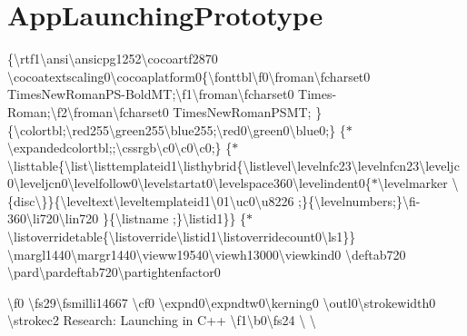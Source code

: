 \chapter{App\+Launching\+Prototype }
\hypertarget{md__e_1_2_github_2_wheel_time_2notes_2_app_launching_prototype}{}\label{md__e_1_2_github_2_wheel_time_2notes_2_app_launching_prototype}
\{\textbackslash{}rtf1\textbackslash{}ansi\textbackslash{}ansicpg1252\textbackslash{}cocoartf2870 \textbackslash{}cocoatextscaling0\textbackslash{}cocoaplatform0\{\textbackslash{}fonttbl\textbackslash{}f0\textbackslash{}froman\textbackslash{}fcharset0 Times\+New\+Roman\+PS-\/\+Bold\+MT;\textbackslash{}f1\textbackslash{}froman\textbackslash{}fcharset0 Times-\/\+Roman;\textbackslash{}f2\textbackslash{}froman\textbackslash{}fcharset0 Times\+New\+Roman\+PSMT; \} \{\textbackslash{}colortbl;\textbackslash{}red255\textbackslash{}green255\textbackslash{}blue255;\textbackslash{}red0\textbackslash{}green0\textbackslash{}blue0;\} \{\texorpdfstring{$\ast$}{*}\textbackslash{}expandedcolortbl;;\textbackslash{}cssrgb\textbackslash{}c0\textbackslash{}c0\textbackslash{}c0;\} \{\texorpdfstring{$\ast$}{*}\textbackslash{}listtable\{\textbackslash{}list\textbackslash{}listtemplateid1\textbackslash{}listhybrid\{\textbackslash{}listlevel\textbackslash{}levelnfc23\textbackslash{}levelnfcn23\textbackslash{}leveljc0\textbackslash{}leveljcn0\textbackslash{}levelfollow0\textbackslash{}levelstartat0\textbackslash{}levelspace360\textbackslash{}levelindent0\{\texorpdfstring{$\ast$}{*}\textbackslash{}levelmarker \textbackslash{}\{disc\textbackslash{}\}\}\{\textbackslash{}leveltext\textbackslash{}leveltemplateid1\textbackslash{}\textquotesingle{}01\textbackslash{}uc0\textbackslash{}u8226 ;\}\{\textbackslash{}levelnumbers;\}\textbackslash{}fi-\/360\textbackslash{}li720\textbackslash{}lin720 \}\{\textbackslash{}listname ;\}\textbackslash{}listid1\}\} \{\texorpdfstring{$\ast$}{*}\textbackslash{}listoverridetable\{\textbackslash{}listoverride\textbackslash{}listid1\textbackslash{}listoverridecount0\textbackslash{}ls1\}\} \textbackslash{}margl1440\textbackslash{}margr1440\textbackslash{}vieww19540\textbackslash{}viewh13000\textbackslash{}viewkind0 \textbackslash{}deftab720 \textbackslash{}pard\textbackslash{}pardeftab720\textbackslash{}partightenfactor0

\textbackslash{}f0{\bfseries{}} \textbackslash{}fs29\textbackslash{}fsmilli14667 \textbackslash{}cf0 \textbackslash{}expnd0\textbackslash{}expndtw0\textbackslash{}kerning0 \textbackslash{}outl0\textbackslash{}strokewidth0 \textbackslash{}strokec2 Research:\+  Launching in C++ \textbackslash{}f1\textbackslash{}b0\textbackslash{}fs24 \textbackslash{} \textbackslash{}

